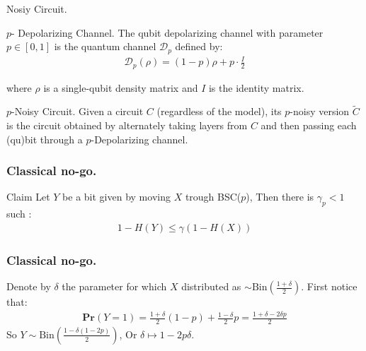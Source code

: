 \documentclass{beamer}
\begin{document}
\begin{frame}{Nosiy Circuit.}
  \begin{definition}{ $p$- Depolarizing Channel. } 
    The qubit depolarizing channel with parameter $ p \in [0,1] $ is the quantum channel $ \mathcal{D}_p $ defined by:
\begin{equation*}
  \begin{split}
\mathcal{D}_p(\rho) = (1 - p) \rho + p \cdot \frac{I}{2}
  \end{split}
\end{equation*}

where $ \rho $ is a single-qubit density matrix and $ I $ is the identity matrix.

  \end{definition}
  \begin{definition}{$p$-Noisy Circuit.}
    Given a circuit $C$ (regardless of the model), its $p$-noisy version $\tilde{C}$ is the circuit obtained by alternately taking layers from $C$ and then passing each (qu)bit through a $p$-Depolarizing channel.
  \end{definition}
\end{frame}

\begin{frame}
  \frametitle{Classical no-go.}
  
\begin{block}{Claim}
  Let $Y$ be a bit given by moving $X$ trough BSC($p$), Then there is $\gamma_{p} < 1$ such :
  \begin{equation*}
    \begin{split}
      1 - H(Y) \le \gamma \left( 1 - H(X) \right)
    \end{split}
  \end{equation*}
\end{block}

\end{frame}

\begin{frame}
  \frametitle{Classical no-go.}
  Denote by $\delta$ the parameter for which $X$ distributed as $\sim \text{Bin}(\frac{1+\delta}{2})$. First notice that:  
  \begin{equation*}
    \begin{split}
      \textbf{Pr}\left( Y = 1 \right) = \frac{1+\delta}{2} (1 -p) + \frac{1-\delta}{2}p = \frac{1 + \delta - 2\delta p}{2}  
    \end{split}
  \end{equation*}
  So $Y \sim \text{Bin}(  \frac{1 -\delta( 1 -  2 p)}{2} )$, Or $\delta \mapsto 1-2p \delta$. 
\end{frame}
\end{document}
